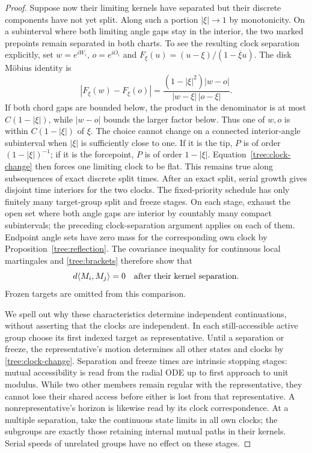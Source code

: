 \begin{proof}
Suppose now their limiting kernels have separated but their discrete
components have not yet split.  Along such a portion $|\xi|\to1$ by
monotonicity.  On a subinterval where both limiting angle gaps stay in
the interior, the two marked prepoints remain separated in both
charts.  To see the resulting clock separation explicitly, set
$w=e^{iW_i}$, $o=e^{iO_i}$ and $F_\xi(u)=(u-\xi)/(1-\overline\xi u)$.
The disk M\"obius identity is
\[
 |F_\xi(w)-F_\xi(o)|
 =\frac{(1-|\xi|^2)|w-o|}{|w-\xi|\,|o-\xi|}.
\]
If both chord gaps are bounded below, the product in the denominator
is at most $C(1-|\xi|)$, while $|w-o|$ bounds the larger factor below.
Thus one of $w,o$ is within $C(1-|\xi|)$ of $\xi$.  The choice cannot
change on a connected interior-angle subinterval when $|\xi|$ is
sufficiently close to one.  If it is the tip, $P$ is of order
$(1-|\xi|)^{-1}$; if it is the forcepoint, $P$ is of order $1-|\xi|$.  Equation~\eqref{tree:clock-change}
then forces one limiting clock to be flat.  This remains true along
subsequences of exact discrete split times.  After an exact split,
serial growth gives disjoint time interiors for the two clocks.
The fixed-priority schedule has only finitely many target-group split
and freeze stages.  On each stage, exhaust the open set where both
angle gaps are interior by countably many compact subintervals; the
preceding clock-separation argument applies on each of them.
Endpoint angle sets have zero mass
for the corresponding own clock by Proposition~\ref{tree:reflection}.
The covariance inequality for continuous local martingales and
\eqref{tree:brackets} therefore show that
\begin{equation}\label{tree:orthogonal}
 d\langle M_i,M_j\rangle=0
 \quad\hbox{after their kernel separation}.
\end{equation}
Frozen targets are omitted from this comparison.

We spell out why these characteristics determine independent
continuations, without asserting that the clocks are independent.
In each still-accessible active group choose its first indexed target
as representative.  Until a separation or freeze, the representative's
motion determines all other states and clocks by
\eqref{tree:clock-change}.  Separation and freeze times are intrinsic
stopping stages: mutual accessibility is read from the radial ODE up
to first approach to unit modulus.  While two other members remain
regular with the representative, they cannot lose their shared access
before either is lost from that representative.  A nonrepresentative's
horizon is likewise read by its clock correspondence.  At a multiple
separation, take the continuous state limits in all own clocks; the
subgroups are exactly those retaining internal mutual paths in their
kernels.  Serial speeds of unrelated groups have no effect on these
stages.


\end{proof}
